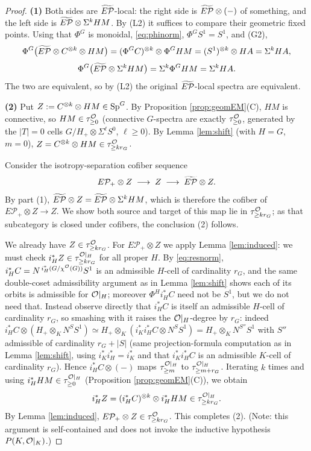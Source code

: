 \begin{proof}
\textbf{(1)} Both sides are $\widetilde{E\mathcal P}$-local: the right side is $\widetilde{E\mathcal P}\otimes(-)$ of
something, and the left side is $\widetilde{E\mathcal P}\otimes\Sigma^k HM$. By (L2) it suffices to
compare their geometric fixed points. Using that $\Phi^G$ is monoidal,
\eqref{eq:phinorm}, $\Phi^G S^1=S^1$, and (G2),
\[
\Phi^G\bigl(\widetilde{E\mathcal P}\otimes C^{\otimes k}\otimes HM\bigr)
=(\Phi^G C)^{\otimes k}\otimes\Phi^G HM
=(S^1)^{\otimes k}\otimes HA=\Sigma^k HA ,
\]
\[
\Phi^G\bigl(\widetilde{E\mathcal P}\otimes\Sigma^k HM\bigr)=\Sigma^k\Phi^G HM=\Sigma^k HA .
\]
The two are equivalent, so by (L2) the original $\widetilde{E\mathcal P}$-local spectra are
equivalent.

\textbf{(2)} Put $Z:=C^{\otimes k}\otimes HM\in\mathrm{Sp}^G$. By Proposition
\ref{prop:geomEM}(C), $HM$ is connective, so $HM\in\tau^{\mathcal{O}}_{\ge 0}$ (connective
$G$-spectra are exactly $\tau^{\mathcal{O}}_{\ge 0}$, generated by the $|T|=0$ cells
$G/H_+\otimes\Sigma^\ell S^0$, $\ell\ge 0$). By Lemma \ref{lem:shift} (with $H=G$,
$m=0$), $Z=C^{\otimes k}\otimes HM\in\tau^{\mathcal{O}}_{\ge k r_G}$.

Consider the isotropy-separation cofiber sequence
\[
E\mathcal P_+\otimes Z\;\longrightarrow\; Z\;\longrightarrow\;\widetilde{E\mathcal P}\otimes Z .
\]
By part (1), $\widetilde{E\mathcal P}\otimes Z=\widetilde{E\mathcal P}\otimes\Sigma^k HM$, which is therefore the cofiber
of $E\mathcal P_+\otimes Z\to Z$. We show both source and target of this map lie
in $\tau^{\mathcal{O}}_{\ge k r_G}$; as that subcategory is closed under cofibers, the
conclusion (2) follows.

We already have $Z\in\tau^{\mathcal{O}}_{\ge k r_G}$. For $E\mathcal P_+\otimes Z$ we apply
Lemma \ref{lem:induced}: we must check $i_H^\ast Z\in\tau^{\mathcal{O}|_H}_{\ge k r_G}$ for
all proper $H$. By \eqref{eq:resnorm}, $i_H^\ast C=N^{\,i_H^\ast(G/\chi^{\mathcal{O}}(G))}S^1$
is an admissible $H$-cell of cardinality $r_G$, and the same double-coset
admissibility argument as in Lemma \ref{lem:shift} shows each of its orbits is
admissible for $\mathcal{O}|_H$; moreover $\Phi^H i_H^\ast C$ need not be $S^1$, but we do
not need that. Instead observe directly that $i_H^\ast C$ is itself an admissible
$H$-cell of cardinality $r_G$, so smashing with it raises the $\mathcal{O}|_H$-degree by
$r_G$: indeed $i_H^\ast C\otimes(H_+\otimes_K N^S S^1)\simeq
H_+\otimes_K(i_K^\ast i_H^\ast C\otimes N^S S^1)=H_+\otimes_K N^{S''}S^1$ with $S''$
admissible of cardinality $r_G+|S|$ (same projection-formula computation as in
Lemma \ref{lem:shift}, using $i_K^\ast i_H^\ast=i_K^\ast$ and that
$i_K^\ast i_H^\ast C$ is an admissible $K$-cell of cardinality $r_G$). Hence
$i_H^\ast C\otimes(-)$ maps $\tau^{\mathcal{O}|_H}_{\ge m}$ to $\tau^{\mathcal{O}|_H}_{\ge m+r_G}$.
Iterating $k$ times and using $i_H^\ast HM\in\tau^{\mathcal{O}|_H}_{\ge 0}$
(Proposition \ref{prop:geomEM}(C)), we obtain
\[
i_H^\ast Z=(i_H^\ast C)^{\otimes k}\otimes i_H^\ast HM\in\tau^{\mathcal{O}|_H}_{\ge k r_G}.
\]
By Lemma \ref{lem:induced}, $E\mathcal P_+\otimes Z\in\tau^{\mathcal{O}}_{\ge k r_G}$. This
completes (2). (Note: this argument is self-contained and does not invoke the
inductive hypothesis $P(K,\mathcal{O}|_K)$.)


\end{proof}

